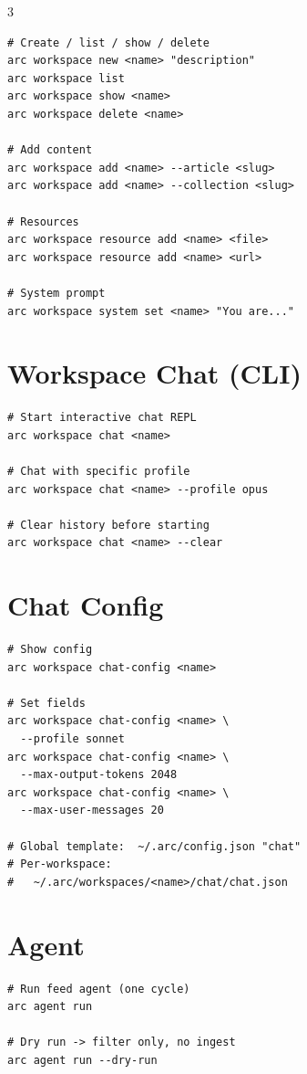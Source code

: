 \documentclass[10pt,a4paper,landscape]{article}
\begin{document}
\begin{multicols}{3}
\begin{lstlisting}
# Create / list / show / delete
arc workspace new <name> "description"
arc workspace list
arc workspace show <name>
arc workspace delete <name>

# Add content
arc workspace add <name> --article <slug>
arc workspace add <name> --collection <slug>

# Resources
arc workspace resource add <name> <file>
arc workspace resource add <name> <url>

# System prompt
arc workspace system set <name> "You are..."
\end{lstlisting}

\section{Workspace Chat (CLI)}

\begin{lstlisting}
# Start interactive chat REPL
arc workspace chat <name>

# Chat with specific profile
arc workspace chat <name> --profile opus

# Clear history before starting
arc workspace chat <name> --clear
\end{lstlisting}

\section{Chat Config}

\begin{lstlisting}
# Show config
arc workspace chat-config <name>

# Set fields
arc workspace chat-config <name> \
  --profile sonnet
arc workspace chat-config <name> \
  --max-output-tokens 2048
arc workspace chat-config <name> \
  --max-user-messages 20

# Global template:  ~/.arc/config.json "chat"
# Per-workspace:
#   ~/.arc/workspaces/<name>/chat/chat.json
\end{lstlisting}

\section{Agent}

\begin{lstlisting}
# Run feed agent (one cycle)
arc agent run

# Dry run -> filter only, no ingest
arc agent run --dry-run


\end{lstlisting}
\end{multicols}
\end{document}
